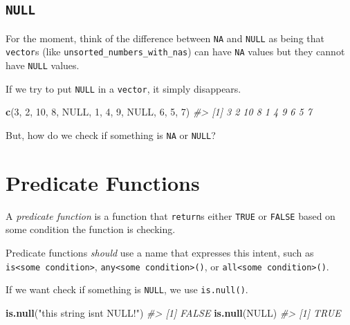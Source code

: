 \documentclass[
]{report}
\newenvironment{Shaded}{\begin{snugshade}}{\end{snugshade}}
\newcommand{\CommentTok}[1]{\textcolor[rgb]{0.56,0.35,0.01}{\textit{#1}}}
\newcommand{\DecValTok}[1]{\textcolor[rgb]{0.00,0.00,0.81}{#1}}
\newcommand{\KeywordTok}[1]{\textcolor[rgb]{0.13,0.29,0.53}{\textbf{#1}}}
\newcommand{\NormalTok}[1]{#1}
\newcommand{\OtherTok}[1]{\textcolor[rgb]{0.56,0.35,0.01}{#1}}
\newcommand{\StringTok}[1]{\textcolor[rgb]{0.31,0.60,0.02}{#1}}
\begin{document}
\hypertarget{null}{%
\subsection{\texorpdfstring{\texttt{NULL}}{NULL}}\label{null}}

For the moment, think of the difference between \texttt{NA} and \texttt{NULL} as being that \texttt{vector}s (like \texttt{unsorted\_numbers\_with\_nas}) can have \texttt{NA} values but they cannot have \texttt{NULL} values.

If we try to put \texttt{NULL} in a \texttt{vector}, it simply disappears.

\begin{Shaded}
\begin{Highlighting}[]
\KeywordTok{c}\NormalTok{(}\DecValTok{3}\NormalTok{, }\DecValTok{2}\NormalTok{, }\DecValTok{10}\NormalTok{, }\DecValTok{8}\NormalTok{, }\OtherTok{NULL}\NormalTok{, }\DecValTok{1}\NormalTok{, }\DecValTok{4}\NormalTok{, }\DecValTok{9}\NormalTok{, }\OtherTok{NULL}\NormalTok{, }\DecValTok{6}\NormalTok{, }\DecValTok{5}\NormalTok{, }\DecValTok{7}\NormalTok{)}
\CommentTok{\#\textgreater{}  [1]  3  2 10  8  1  4  9  6  5  7}
\end{Highlighting}
\end{Shaded}

But, how do we check if something is \texttt{NA} or \texttt{NULL}?

\hypertarget{predicate-functions}{%
\section{Predicate Functions}\label{predicate-functions}}

A \emph{predicate function} is a function that \texttt{return}s either \texttt{TRUE} or \texttt{FALSE} based on some condition the function is checking.

Predicate functions \emph{should} use a name that expresses this intent, such as \texttt{is\textless{}some\ condition\textgreater{}}, \texttt{any\textless{}some\ condition\textgreater{}()}, or \texttt{all\textless{}some\ condition\textgreater{}()}.

If we want check if something is \texttt{NULL}, we use \texttt{is.null()}.

\begin{Shaded}
\begin{Highlighting}[]
\KeywordTok{is.null}\NormalTok{(}\StringTok{"this string isn\textquotesingle{}t NULL!"}\NormalTok{)}
\CommentTok{\#\textgreater{} [1] FALSE}
\KeywordTok{is.null}\NormalTok{(}\OtherTok{NULL}\NormalTok{)}
\CommentTok{\#\textgreater{} [1] TRUE}
\end{Highlighting}
\end{Shaded}
\end{document}
